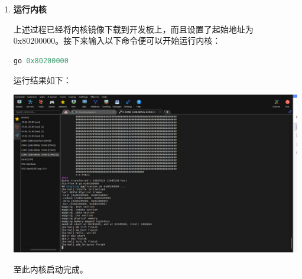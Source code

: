 {\begin{enumerate}
	找到“IP设置”部分，点击“编辑”，按照如图所示打开IPv4，并填写IP地址，子网前缀长度，网关。这样终端的IP地址就设置为相应的IP地址了。
	
	这里涉及到了部分IP地址相关的知识，再次强调读者要保证开发板和终端的地址处在同一局域网中，也就是网络号相同。这样才能搭建tftp服务器。
	
	\item \textbf{运行内核}
	
	上述过程已经将内核镜像下载到开发板上，而且设置了起始地址为0x80200000。接下来输入以下命令便可以开始运行内核：
	
	\begin{lstlisting}[language={Rust}]
	go 0x80200000
	\end{lstlisting}
	
	运行结果如下：
	
	
	\centering
	\includegraphics[width=0.9\linewidth]{figures/08-02-内核运行.jpg}
	\raggedright

	
	至此内核启动完成。
	
	
	
	
\end{enumerate}
}